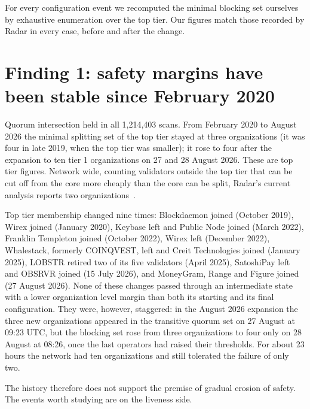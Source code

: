 \documentclass[11pt,a4paper]{article}
\begin{document}
For every configuration event we recomputed the minimal blocking set ourselves by exhaustive enumeration over the top tier. Our figures match those recorded by Radar in every case, before and after the change.

\section{Finding 1: safety margins have been stable since February 2020}
Quorum intersection held in all 1,214,403 scans. From February 2020 to August 2026 the minimal splitting set of the top tier stayed at three organizations (it was four in late 2019, when the top tier was smaller); it rose to four after the expansion to ten tier 1 organizations on 27 and 28 August 2026. These are top tier figures. Network wide, counting validators outside the top tier that can be cut off from the core more cheaply than the core can be split, Radar's current analysis reports two organizations~\cite{radarcommit}.

Top tier membership changed nine times: Blockdaemon joined (October 2019), Wirex joined (January 2020), Keybase left and Public Node joined (March 2022), Franklin Templeton joined (October 2022), Wirex left (December 2022), Whalestack, formerly COINQVEST, left and Creit Technologies joined (January 2025), LOBSTR retired two of its five validators (April 2025), SatoshiPay left and OBSRVR joined (15 July 2026), and MoneyGram, Range and Figure joined (27 August 2026). None of these changes passed through an intermediate state with a lower organization level margin than both its starting and its final configuration. They were, however, staggered: in the August 2026 expansion the three new organizations appeared in the transitive quorum set on 27 August at 09:23 UTC, but the blocking set rose from three organizations to four only on 28 August at 08:26, once the last operators had raised their thresholds. For about 23 hours the network had ten organizations and still tolerated the failure of only two.

The history therefore does not support the premise of gradual erosion of safety. The events worth studying are on the liveness side.
\end{document}
